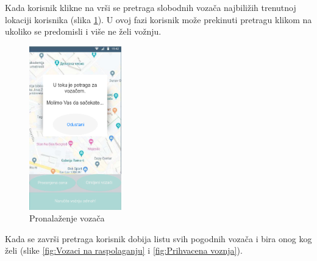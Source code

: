 Kada korisnik klikne na  vrši se pretraga slobodnih vozača najbiližih trenutnoj lokaciji korisnika (slika \ref{fig:Pronalazenje vozaca}). U ovoj fazi korisnik može prekinuti pretragu klikom na  ukoliko se predomisli i više ne želi vožnju.

\begin{figure}[H]
\begin{center}
\includegraphics[width=4cm]{Slike/Pronalazenje_vozaca.png}
\end{center}
    \caption{Pronalaženje vozača}
\label{fig:Pronalazenje vozaca}
\end{figure}


Kada se završi pretraga korisnik dobija listu svih pogodnih vozača i bira onog kog želi (slike \ref{fig:Vozaci na raspolaganju} i \ref{fig:Prihvacena voznja}).

